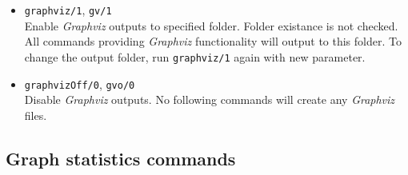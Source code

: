 \documentclass[11pt, a4paper,draft]{article}
\newcommand{\pl}[1]{\texttt{#1}} %
\theoremstyle{plain}
\theoremstyle{definition}
\theoremstyle{remark}
\newcommand{\gv}{\textit{Graphviz}}
\begin{document}
\begin{itemize}
\item \pl{graphviz/1}, \pl{gv/1} \\
Enable \gv{} outputs to specified folder. 
Folder existance is not checked. 
All commands providing \gv{} functionality will output to this folder. 
To change the output folder, run \pl{graphviz/1} again with new parameter.

\item \pl{graphvizOff/0}, \pl{gvo/0} \\
Disable \gv{} outputs. No following commands will create any \gv{} files.
\end{itemize}

\subsection{Graph statistics commands}
\end{document}
